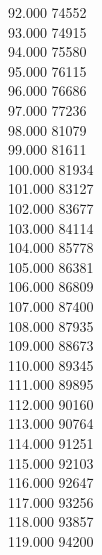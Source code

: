 { 92.000	74552 \\
 93.000	74915 \\
 94.000	75580 \\
 95.000	76115 \\
 96.000	76686 \\
 97.000	77236 \\
 98.000	81079 \\
 99.000	81611 \\
 100.000	81934 \\
 101.000	83127 \\
 102.000	83677 \\
 103.000	84114 \\
 104.000	85778 \\
 105.000	86381 \\
 106.000	86809 \\
 107.000	87400 \\
 108.000	87935 \\
 109.000	88673 \\
 110.000	89345 \\
 111.000	89895 \\
 112.000	90160 \\
 113.000	90764 \\
 114.000	91251 \\
 115.000	92103 \\
 116.000	92647 \\
 117.000	93256 \\
 118.000	93857 \\
 119.000	94200 \\
}
